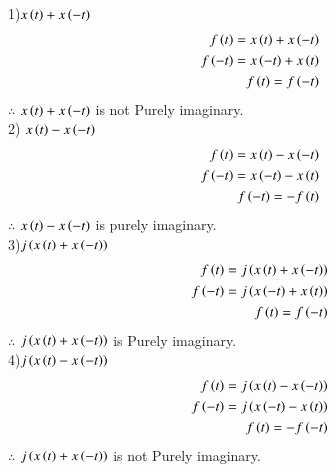 \documentclass[journal,12pt,twocolumn]{IEEEtran}
\theoremstyle{remark}
\begin{document}
1)$x\left(t\right) + x\left(-t\right)$\\
\begin{align}
  f\left(t\right)= x\left(t\right) + x\left(-t\right)\\
  f\left(-t\right)=x\left(-t\right) + x\left(t\right)\\
  f\left(t\right)=f\left(-t\right)
\end{align}
$\therefore$ $x\left(t\right) + x\left(-t\right)$ is not Purely imaginary.\\
2) $x\left(t\right) - x\left(-t\right)$\\
\begin{align}
  f\left(t\right)= x\left(t\right) - x\left(-t\right)\\
  f\left(-t\right)=x\left(-t\right) - x\left(t\right)\\
  f\left(-t\right)=-f\left(t\right)
\end{align}
$\therefore$ $x\left(t\right) - x\left(-t\right)$ is purely imaginary.\\
3)$j\left(x\left(t\right) + x\left(-t\right)\right)$
\begin{align}
  f\left(t\right)=j\left(x\left(t\right) + x\left(-t\right)\right)\\
  f\left(-t\right)=j\left(x\left(-t\right) + x\left(t\right)\right)\\
  f\left(t\right)=f\left(-t\right)
\end{align}
$\therefore$ $j\left(x\left(t\right) + x\left(-t\right)\right)$ is Purely imaginary.\\
4)$j\left(x\left(t\right) - x\left(-t\right)\right)$
\begin{align}
   f\left(t\right)=j\left(x\left(t\right) - x\left(-t\right)\right)\\
  f\left(-t\right)=j\left(x\left(-t\right) - x\left(t\right)\right)\\
  f\left(t\right)=-f\left(-t\right)
\end{align}
$\therefore$ $j\left(x\left(t\right) + x\left(-t\right)\right)$ is not Purely imaginary.\\
\end{document}
